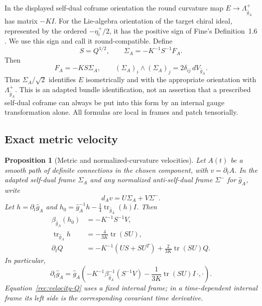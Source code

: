 \documentclass[11pt]{article}
\numberwithin{equation}{section}
\newtheorem{proposition}[theorem]{Proposition}
\theoremstyle{definition}
\theoremstyle{remark}
\begin{document}
In the displayed self-dual coframe orientation the round curvature map
$E\to\Lambda_{\widehat g_A}^+$ has matrix $-KI$. For the Lie-algebra
orientation of the target chiral ideal, represented by the ordered
$-\eta_i^+/2$, it has the positive sign of Fine's Definition~1.6
\cite[Definition 1.6]{Fine2011}. We use this sign and call it
round-compatible. Define
\begin{equation}
 S=Q^{1/2},\qquad
 \Sigma_A=-K^{-1}S^{-1}F_A.
 \label{rec:adapted-frame}
\end{equation}
Then
\begin{equation}
 F_A=-KS\Sigma_A,
 \qquad (\Sigma_A)_i\wedge(\Sigma_A)_j
       =2\delta_{ij}\,dV_{\widehat g_A}.
 \label{rec:adapted-frame-wedge}
\end{equation}
Thus $\Sigma_A/\sqrt2$ identifies $E$ isometrically and with the
appropriate orientation with $\Lambda_{\widehat g_A}^+$.  This is an
adapted bundle identification, not an assertion that a prescribed
self-dual coframe can always be put into this form by an internal
gauge transformation alone.  All formulas are local in frames and
patch tensorially.

\subsection{Exact metric velocity}

\begin{proposition}[Metric and normalized-curvature velocities]
\label{rec:velocity-proposition}
Let $A(t)$ be a smooth path of definite connections in the
chosen component, with $v=\partial_tA$.  In the adapted self-dual frame
$\Sigma_A$ and any normalized anti-self-dual frame $\Sigma^-$ for
$\widehat g_A$, write
\begin{equation}
 d_Av=U\Sigma_A+V\Sigma^-.
 \label{rec:velocity-decomposition}
\end{equation}
Let $h=\partial_t\widehat g_A$ and
$h_0=\widehat g_A^{-1}h-\tfrac14\operatorname{tr}_{\widehat g_A}(h)I$.
Then
\begin{align}
 \beta_{\widehat g_A}(h_0)&=-K^{-1}S^{-1}V,
 \label{rec:velocity-traceless}\\
 \operatorname{tr}_{\widehat g_A}h
       &=-\frac4{3K}\operatorname{tr}(SU),
 \label{rec:velocity-trace}\\
 \partial_tQ
       &=-K^{-1}(US+SU^T)
           +\frac2{3K}\operatorname{tr}(SU)Q.
 \label{rec:velocity-Q}
\end{align}
In particular,
\begin{equation}
 \partial_t\widehat g_A
 =\widehat g_A\left(
       -K^{-1}\beta_{\widehat g_A}^{-1}(S^{-1}V)
       -\frac1{3K}\operatorname{tr}(SU)I
                  \,\cdot,\cdot\right).
 \label{rec:velocity-metric}
\end{equation}
Equation~\eqref{rec:velocity-Q} uses a fixed internal frame; in a
time-dependent internal frame its left side is the corresponding
covariant time derivative.
\end{proposition}
\end{document}

